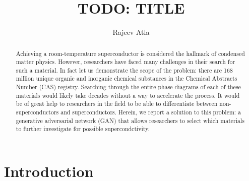 \documentclass{article}
\title{TODO: TITLE}
\author{Rajeev Atla}
\date{}
\begin{document}
\begin{abstract}
Achieving a room-temperature superconductor is considered the hallmark of condensed matter physics.
However, researchers have faced many challenges in their search for such a material.
In fact let us demonstrate the scope of the problem: there are 168 million unique organic and inorganic chemical substances in the Chemical Abstracts Number (CAS) registry.
Searching through the entire phase diagrams of each of these materials would likely take decades without a way to accelerate the process.
It would be of great help to researchers in the field to be able to differentiate between non-superconductors and superconductors.
Herein, we report a solution to this problem: a generative adversarial network (GAN) that allows researchers to select which materials to further investigate for possible supercondctivity.
\end{abstract}


\section{Introduction}
\end{document}

